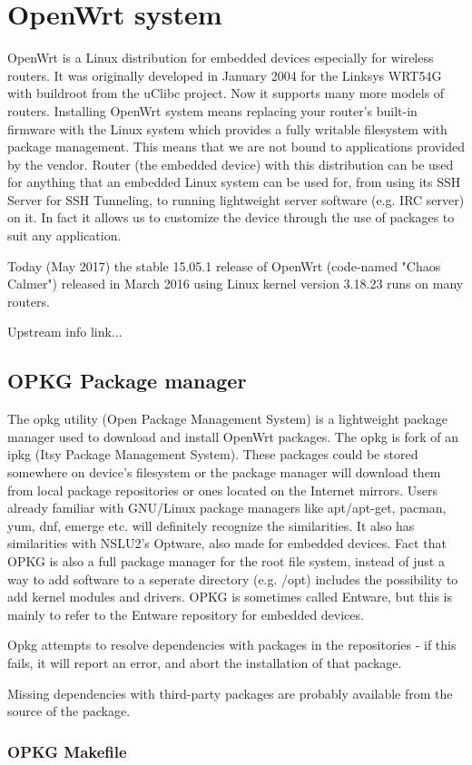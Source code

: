 \chapter{OpenWrt system}\label{owrt}
OpenWrt is a Linux distribution for embedded devices especially for wireless routers.
It was originally developed in January 2004 for the Linksys WRT54G with buildroot from the uClibc project.
Now it supports many more models of routers.
Installing OpenWrt system means replacing your router’s built-in firmware with the Linux system which provides a fully writable filesystem with package management.
This means that we are not bound to applications provided by the vendor.
Router (the embedded device) with this distribution can be used for anything that an embedded Linux system can be used for, from using its SSH Server for SSH Tunneling, to running lightweight server software (e.g. IRC server) on it.
In fact it allows us to customize the device through the use of packages to suit any application.

Today (May 2017) the stable 15.05.1 release of OpenWrt (code-named "Chaos Calmer") released in March 2016 using Linux kernel version 3.18.23 runs on many routers.

 Upstream info link...

\section{OPKG Package manager}

The opkg utility (Open Package Management System) is a lightweight package manager used to download and install OpenWrt packages.
The opkg is fork of an ipkg (Itsy Package Management System).
These packages could be stored somewhere on device's filesystem or the package manager will download them from local package repositories or ones located on the Internet mirrors.
Users already familiar with GNU/Linux package managers like apt/apt-get, pacman, yum, dnf, emerge etc. will definitely recognize the similarities.
It also has similarities with NSLU2's Optware, also made for embedded devices.
Fact that OPKG is also a full package manager for the root file system, instead of just a way to add software to a seperate directory (e.g. /opt) includes the possibility to add kernel modules and drivers.
OPKG is sometimes called Entware, but this is mainly to refer to the Entware repository for embedded devices.

Opkg attempts to resolve dependencies with packages in the repositories - if this fails, it will report an error, and abort the installation of that package.

Missing dependencies with third-party packages are probably available from the source of the package.

\subsection{OPKG Makefile}
